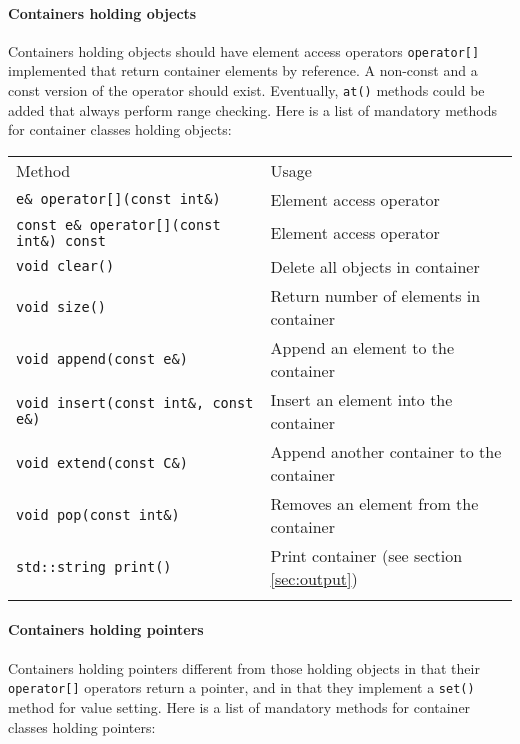 \documentclass{article}[12pt,a4]
\begin{document}
\paragraph{Containers holding objects}

Containers holding objects should have element access operators {\tt operator[]} implemented
that return container elements by reference.
A non-const and a const version of the operator should exist.
Eventually, {\tt at()} methods could be added that always perform range checking.
Here is a list of mandatory methods for container classes holding objects:

\begin{center}
\begin{tabular}{ll}
\hline
\hline
\noalign{\smallskip}
Method & Usage \\
\noalign{\smallskip}
\hline
\noalign{\smallskip}
{\tt e\& operator[](const int\&)} & Element access operator \\
{\tt const e\& operator[](const int\&) const} & Element access operator \\
{\tt void clear()} & Delete all objects in container \\
{\tt void size()} & Return number of elements in container \\
{\tt void append(const e\&)} & Append an element to the container \\
{\tt void insert(const int\&, const e\&)} & Insert an element into the container \\
{\tt void extend(const C\&)} & Append another container to the container \\
{\tt void pop(const int\&)} & Removes an element from the container \\
{\tt std::string print()} & Print container (see section \ref{sec:output}) \\
\noalign{\smallskip}
\hline
\end{tabular}
\end{center}


\paragraph{Containers holding pointers}

Containers holding pointers different from those holding objects in that their {\tt operator[]}
operators return a pointer, and in that they implement a {\tt set()} method for value setting.
Here is a list of mandatory methods for container classes holding pointers:
\end{document}
